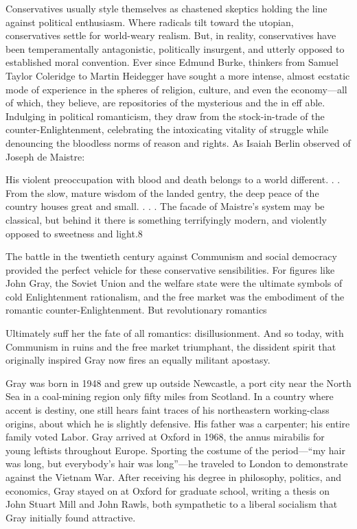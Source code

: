  \par 
Conservatives usually style themselves as chastened skeptics holding the line against political enthusiasm. Where radicals tilt toward the utopian, conservatives settle for world-weary realism. But, in reality, conservatives have been temperamentally antagonistic, politically insurgent, and utterly opposed to established moral convention. Ever since Edmund Burke, thinkers from Samuel Taylor Coleridge to Martin Heidegger have sought a more intense, almost ecstatic mode of experience in the spheres of religion, culture, and even the economy—all of which, they believe, are repositories of the mysterious and the in eff able. Indulging in political romanticism, they draw from the stock-in-trade of the counter-Enlightenment, celebrating the intoxicating vitality of struggle while denouncing the bloodless norms of reason and rights. As Isaiah Berlin observed of Joseph de Maistre:
 \par 
His violent preoccupation with blood and death belongs to a world different. . . From the slow, mature wisdom of the landed gentry, the deep peace of the country houses great and small. . . . The facade of Maistre’s system may be classical, but behind it there is something terrifyingly modern, and violently opposed to sweetness and light.{\color{blue}8}
 \par 
The battle in the twentieth century against Communism and social democracy provided the perfect vehicle for these conservative sensibilities. For figures like John Gray, the Soviet Union and the welfare state were the ultimate symbols of cold Enlightenment rationalism, and the free market was the embodiment of the romantic counter-Enlightenment. But revolutionary romantics
 \par 
Ultimately suff her the fate of all romantics: disillusionment. And so today, with Communism in ruins and the free market triumphant, the dissident spirit that originally inspired Gray now fires an equally militant apostasy.
 \par 
Gray was born in 1948 and grew up outside Newcastle, a port city near the North Sea in a coal-mining region only fifty miles from Scotland. In a country where accent is destiny, one still hears faint traces of his northeastern working-class origins, about which he is slightly defensive. His father was a carpenter; his entire family voted Labor. Gray arrived at Oxford in 1968, the annus mirabilis for young leftists throughout Europe. Sporting the costume of the period—“my hair was long, but everybody’s hair was long”—he traveled to London to demonstrate against the Vietnam War. After receiving his degree in philosophy, politics, and economics, Gray stayed on at Oxford for graduate school, writing a thesis on John Stuart Mill and John Rawls, both sympathetic to a liberal socialism that Gray initially found attractive.
